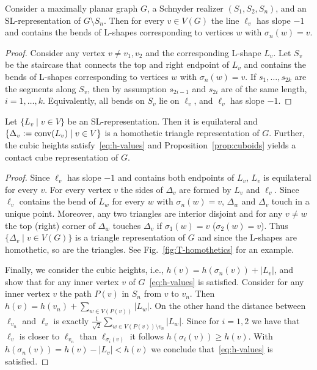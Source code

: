 \documentclass{llncs}
\begin{document}
\begin{lemma}\label{lem:overconstrained}
 Consider a maximally planar graph $G$, a Schnyder realizer $(S_1,S_2,S_n)$, and an SL-representation of $G\setminus S_n$. Then for every $v \in V(G)$ the line $\ell_v$ has slope $-1$ and contains the bends of L-shapes corresponding to vertices $w$ with $\sigma_n(w) = v$.
\end{lemma}
\begin{proof}
 Consider any vertex $v \neq v_1,v_2$ and the corresponding L-shape $L_v$. Let $S_v$ be the staircase that connects the top and right endpoint of $L_v$ and contains the bends of L-shapes corresponding to vertices $w$ with $\sigma_n(w) = v$. If $s_1,\ldots,s_{2k}$ are the segments along $S_v$, then by assumption $s_{2i-1}$ and $s_{2i}$ are of the same length, $i=1,\ldots,k$. Equivalently, all bends on $S_v$ lie on $\ell_v$, and $\ell_v$ has slope $-1$.
\end{proof}


\begin{corollary}\label{cor:overconstrained}
 Let $\{L_v \;|\; v \in V\}$ be an SL-representation. Then it is equilateral and $\{\Delta_v := {\rm conv}(L_v) \;|\; v \in V\}$ is a homothetic triangle representation of $G$. Further, the cubic heights satisfy~\eqref{eq:h-values} and Proposition~\ref{prop:cuboids} yields a contact cube representation of $G$.
\end{corollary}

\begin{proof}
 Since $\ell_v$ has slope $-1$ and contains both endpoints of $L_v$, $L_v$ is equilateral for every $v$.
For every vertex $v$ the sides of $\Delta_v$ are formed by $L_v$ and $\ell_v$. Since $\ell_v$ contains the bend of $L_w$ for every $w$ with $\sigma_n(w) = v$, $\Delta_w$ and $\Delta_v$ touch in a unique point. Moreover, any two triangles are interior disjoint and for any $v \neq w$ the top (right) corner of $\Delta_w$ touches $\Delta_v$ if $\sigma_1(w) = v$ ($\sigma_2(w) = v$). Thus $\{\Delta_v \;|\; v \in V(G)\}$ is a triangle representation of $G$ and since the L-shapes are homothetic, so are the triangles. See Fig.~\ref{fig:T-homothetics} for an example.

 Finally, we consider the cubic heights, i.e., $h(v) = h(\sigma_n(v)) + |L_v|$, and show that for any inner vertex $v$ of $G$~\eqref{eq:h-values} is satisfied. Consider for any inner vertex $v$ the path $P(v)$ in $S_n$ from $v$ to $v_n$. Then $h(v) = h(v_n) + \sum_{w \in V(P(v))} |L_w|$. On the other hand the distance between $\ell_{v_n}$ and $\ell_v$ is exactly $\frac{1}{\sqrt{2}}\sum_{w \in V(P(v)) \setminus v_n} |L_w|$. Since for $i=1,2$ we have that $\ell_v$ is closer to $\ell_{v_n}$ than $\ell_{\sigma_i(v)}$ it follows $h(\sigma_i(v)) \geq h(v)$. With $h(\sigma_n(v)) = h(v) - |L_v| < h(v)$ we conclude that~\eqref{eq:h-values} is satisfied.
\end{proof}
\end{document}
